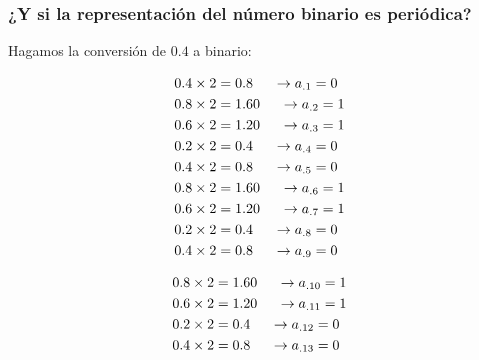 \begin{frame}[fragile]
\frametitle{¿Y si la representación del número binario es periódica?}
Hagamos la conversión de $0.4$ a binario:
\fontsize{10}{10}\selectfont
\begin{minipage}{5cm}
\[ \begin{split}
0.4 \times 2 &= 0.8 \hspace{0.5cm} \rightarrow a_{.1}= 0 \\
0.8 \times 2 &= 1.60 \hspace{0.5cm} \rightarrow a_{.2}= 1 \\
0.6 \times 2 &= 1.20 \hspace{0.5cm} \rightarrow a_{.3}= 1 \\ 
0.2 \times 2 &= 0.4 \hspace{0.5cm} \rightarrow a_{.4}= 0 \\
0.4 \times 2 &= 0.8 \hspace{0.5cm} \rightarrow a_{.5}= 0 \\
0.8 \times 2 &= 1.60 \hspace{0.5cm} \rightarrow a_{.6}= 1 \\
0.6 \times 2 &= 1.20 \hspace{0.5cm} \rightarrow a_{.7}= 1 \\ 
0.2 \times 2 &= 0.4 \hspace{0.5cm} \rightarrow a_{.8}= 0 \\
0.4 \times 2 &= 0.8 \hspace{0.5cm} \rightarrow a_{.9}= 0 \\
\end{split} \]
\end{minipage}
\hspace{0.5cm}
\begin{minipage}{5cm}
\[ \begin{split}
0.8 \times 2 &= 1.60 \hspace{0.5cm} \rightarrow a_{.10}= 1 \\
0.6 \times 2 &= 1.20 \hspace{0.5cm} \rightarrow a_{.11}= 1 \\ 
0.2 \times 2 &= 0.4 \hspace{0.5cm} \rightarrow a_{.12}= 0 \\
0.4 \times 2 &= 0.8 \hspace{0.5cm} \rightarrow a_{.13}= 0 \\
\end{split} \]
\end{minipage}
\end{frame}
